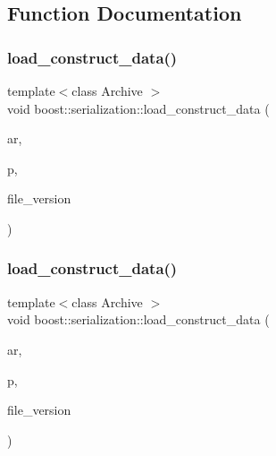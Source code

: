 \subsection{Function Documentation}
\mbox{\label{namespaceboost_1_1serialization_a89dc559f1a8d84e022a738288cdfea24}} 
\subsubsection{\texorpdfstring{load\+\_\+construct\+\_\+data()}{load\_construct\_data()}\hspace{0.1cm}{\footnotesize\ttfamily [1/4]}}
{\footnotesize\ttfamily template$<$class Archive $>$ \\
void boost\+::serialization\+::load\+\_\+construct\+\_\+data (\begin{DoxyParamCaption}\item[{Archive \&}]{ar,  }\item[{\hyperlink{classpan_1_1_card_impl}{pan\+::\+Card\+Impl}$<$ \hyperlink{namespacepan_a1f7350bfd0421afeabe9fa95c16fa811af0ddc0838281faf6d55e2cf840a2a8ef}{pan\+::\+Card\+Type\+::\+Infection} $>$ $\ast$}]{p,  }\item[{const unsigned int}]{file\+\_\+version }\end{DoxyParamCaption})\hspace{0.3cm}{\ttfamily [inline]}}

\mbox{\label{namespaceboost_1_1serialization_ae9c831b8f31fae23f351ac8fb5ce6bae}} 
\subsubsection{\texorpdfstring{load\+\_\+construct\+\_\+data()}{load\_construct\_data()}\hspace{0.1cm}{\footnotesize\ttfamily [2/4]}}
{\footnotesize\ttfamily template$<$class Archive $>$ \\
void boost\+::serialization\+::load\+\_\+construct\+\_\+data (\begin{DoxyParamCaption}\item[{Archive \&}]{ar,  }\item[{\hyperlink{classpan_1_1_card_impl}{pan\+::\+Card\+Impl}$<$ \hyperlink{namespacepan_a1f7350bfd0421afeabe9fa95c16fa811a57d056ed0984166336b7879c2af3657f}{pan\+::\+Card\+Type\+::\+City} $>$ $\ast$}]{p,  }\item[{const unsigned int}]{file\+\_\+version }\end{DoxyParamCaption})\hspace{0.3cm}{\ttfamily [inline]}}

